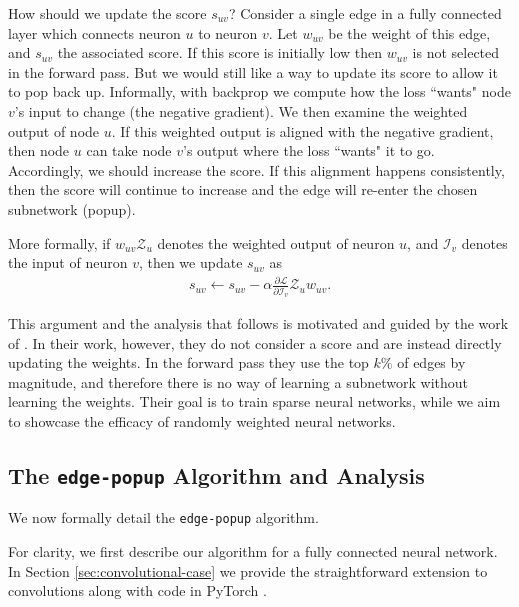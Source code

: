 \documentclass[10pt,twocolumn,letterpaper]{article}
\newcommand*{\I}{\mathcal{I}}
\newcommand*{\loss}{\mathcal{L}}
\newcommand*{\Z}{\mathcal{Z}}
\newcommand{\alg}{\texttt{edge-popup} }
\begin{document}
How should we update the score $s_{uv}$? Consider a single edge in a fully connected layer which connects neuron $u$ to neuron $v$. Let $w_{uv}$ be the weight of this edge, and $s_{uv}$ the associated score. If this score is initially low then $w_{uv}$ is not selected in the forward pass. But we would still like a way to update its score to allow it to pop back up. Informally, with backprop \cite{backprop} we compute how the loss ``wants" node $v$'s input to change (\ie the negative gradient). We then examine the weighted output of node $u$. If this weighted output is aligned with the negative gradient, then node $u$ can take node $v$'s output where the loss ``wants" it to go. Accordingly, we should increase the score. If this alignment happens consistently, then the score will continue to increase and the edge will re-enter the chosen subnetwork (\ie popup).

More formally, if $w_{uv}\Z_{u}$ denotes the weighted output of neuron $u$, and $\I_v$ denotes the input of neuron $v$, then we update $s_{uv}$ as 
\begin{align}
    s_{uv} \gets s_{uv} - \alpha \frac{\partial \loss}{\partial \I_v} \Z_u w_{uv}.
\end{align}

This argument and the analysis that follows is motivated and guided by the work of \cite{dnw}. In their work, however, they do not consider a score and are instead directly updating the weights. In the forward pass they use the top $k\%$ of edges by magnitude, and therefore there is no way of learning a subnetwork without learning the weights. Their goal is to train sparse neural networks, while we aim to showcase the efficacy of randomly weighted neural networks.

\subsection{The \alg Algorithm and Analysis} \label{sec:alg}

We now formally detail the \alg algorithm. 

For clarity, we first describe our algorithm for a fully connected neural network. In Section \ref{sec:convolutional-case} we provide the straightforward extension to convolutions along with code in PyTorch \cite{pytorch}.
\end{document}
